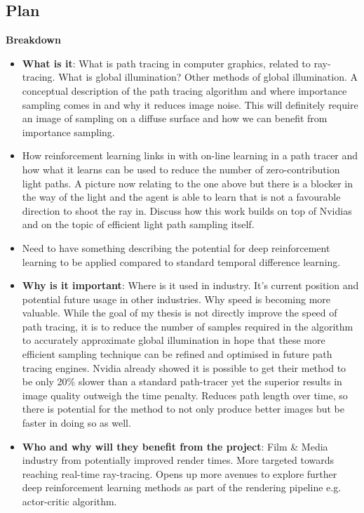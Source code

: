 \documentclass[ %
                    author={Callum Pearce},
                supervisor={Dr. Neill Campbell},
                    degree={MEng},
                     title={How effective are Temporal difference learning methods in reducing the number of zero contribution light paths in Path tracing?},
                  subtitle={},
                      type={research},
                      year={2019} ]{dissertation}
\begin{document}
\subsection{Plan}
\textbf{Breakdown}
\begin{itemize}

\item \textbf{What is it}: What is path tracing in computer graphics, related to ray-tracing. What is global illumination? Other methods of global illumination. A conceptual description of the path tracing algorithm and where importance sampling comes in and why it reduces image noise. This will definitely require an image of sampling on a diffuse surface and how we can benefit from importance sampling. 

\item How reinforcement learning links in with on-line learning in a path tracer and how what it learns can be used to reduce the number of zero-contribution light paths. A picture now relating to the one above but there is a blocker in the way of the light and the agent is able to learn that is not a favourable direction to shoot the ray in. Discuss how this work builds on top of Nvidias and on the topic of efficient light path sampling itself.

\item Need to have something describing the potential for deep reinforcement learning to be applied compared to standard temporal difference learning.

\item \textbf{Why is it important}: Where is it used in industry. It's current position and potential future usage in other industries. Why speed is becoming more valuable. While the goal of my thesis is not directly improve the speed of path tracing, it is to reduce the number of samples required in the algorithm to accurately approximate global illumination in hope that these more efficient sampling technique can be refined and optimised in future path tracing engines. Nvidia already showed it is possible to get their method to be only 20\% slower than a standard path-tracer yet the superior results in image quality outweigh the time penalty. Reduces path length over time, so there is potential for the method to not only produce better images but be faster in doing so as well.

\item \textbf{Who and why will they benefit from the project}: Film \& Media industry from potentially improved render times. More targeted towards reaching real-time ray-tracing. Opens up more avenues to explore further deep reinforcement learning methods as part of the rendering pipeline e.g. actor-critic algorithm.


\end{itemize}
\end{document}
